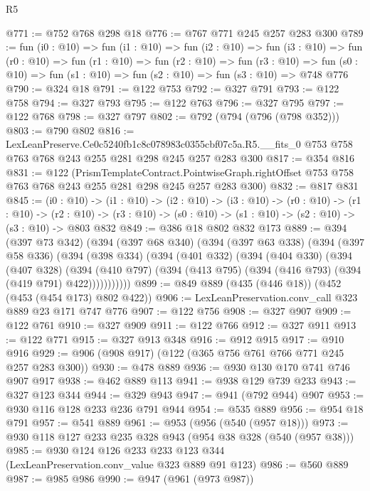 \begin{lexlean}{R5}
\begin{coremodule}
@771 := @752 @768 @298 @18
@776 := @767 @771 @245 @257 @283 @300
@789 := fun (i0 : @10) =>
  fun (i1 : @10) =>
  fun (i2 : @10) =>
  fun (i3 : @10) =>
  fun (r0 : @10) =>
  fun (r1 : @10) =>
  fun (r2 : @10) =>
  fun (r3 : @10) =>
  fun (s0 : @10) => fun (s1 : @10) => fun (s2 : @10) => fun (s3 : @10) => @748 @776
@790 := @324 @18
@791 := @122 @753
@792 := @327 @791
@793 := @122 @758
@794 := @327 @793
@795 := @122 @763
@796 := @327 @795
@797 := @122 @768
@798 := @327 @797
@802 := @792 (@794 (@796 (@798 @352)))
@803 := @790 @802
@816 := LexLeanPreserve.Ce0c5240fb1c8c078983c0355cbf07c5a.R5.__fits_0
    @753
    @758
    @763
    @768
    @243
    @255
    @281
    @298
    @245
    @257
    @283
    @300
@817 := @354 @816
@831 := @122
    (PrismTemplateContract.PointwiseGraph.rightOffset
      @753
      @758
      @763
      @768
      @243
      @255
      @281
      @298
      @245
      @257
      @283
      @300)
@832 := @817 @831
@845 := (i0 : @10) ->
  (i1 : @10) ->
  (i2 : @10) ->
  (i3 : @10) ->
  (r0 : @10) ->
  (r1 : @10) ->
  (r2 : @10) -> (r3 : @10) -> (s0 : @10) -> (s1 : @10) -> (s2 : @10) -> (s3 : @10) -> @803 @832
@849 := @386 @18 @802 @832 @173
@889 := @394
    (@397 @73 @342)
    (@394
      (@397 @68 @340)
      (@394
        (@397 @63 @338)
        (@394
          (@397 @58 @336)
          (@394
            (@398 @334)
            (@394
              (@401 @332)
              (@394
                (@404 @330)
                (@394
                  (@407 @328)
                  (@394
                    (@410 @797)
                    (@394 (@413 @795) (@394 (@416 @793) (@394 (@419 @791) @422)))))))))))
@899 := @849 @889 (@435 (@446 @18)) (@452 (@453 (@454 @173) @802 @422))
@906 := LexLeanPreservation.conv_call @323 @889 @23 @171 @747 @776
@907 := @122 @756
@908 := @327 @907
@909 := @122 @761
@910 := @327 @909
@911 := @122 @766
@912 := @327 @911
@913 := @122 @771
@915 := @327 @913 @348
@916 := @912 @915
@917 := @910 @916
@929 := @906 (@908 @917) (@122 (@365 @756 @761 @766 @771 @245 @257 @283 @300))
@930 := @478 @889
@936 := @930 @130 @170 @741 @746 @907 @917
@938 := @462 @889 @113
@941 := @938 @129 @739 @233
@943 := @327 @123 @344
@944 := @329 @943
@947 := @941 (@792 @944) @907
@953 := @930 @116 @128 @233 @236 @791 @944
@954 := @535 @889
@956 := @954 @18 @791
@957 := @541 @889
@961 := @953 (@956 (@540 (@957 @18)))
@973 := @930 @118 @127 @233 @235 @328 @943 (@954 @38 @328 (@540 (@957 @38)))
@985 := @930 @124 @126 @233 @233 @123 @344 (LexLeanPreservation.conv_value @323 @889 @91 @123)
@986 := @560 @889
@987 := @985 @986
@990 := @947 (@961 (@973 @987))

\end{coremodule}
\end{lexlean}
